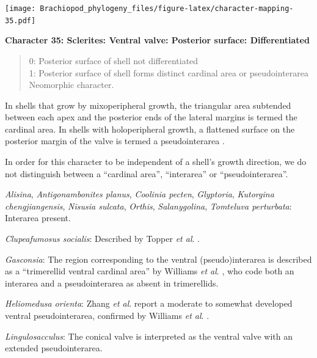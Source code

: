 \documentclass[openany]{book}
\theoremstyle{definition}
\theoremstyle{definition}
\theoremstyle{definition}
\theoremstyle{remark}
\begin{document}
\texttt{[image: Brachiopod\_phylogeny\_files/figure-latex/character-mapping-35.pdf]}

\textbf{Character 35: Sclerites: Ventral valve: Posterior surface:
Differentiated}

\begin{quote}
0: Posterior surface of shell not differentiated\\
1: Posterior surface of shell forms distinct cardinal area or
pseudointerarea\\
Neomorphic character.
\end{quote}

In shells that grow by mixoperipheral growth, the triangular area
subtended between each apex and the posterior ends of the lateral
margins is termed the cardinal area. In shells with holoperipheral
growth, a flattened surface on the posterior margin of the valve is
termed a pseudointerarea
\citep[paraphrasing][]{Williams1997Introduction}.

In order for this character to be independent of a shell's growth
direction, we do not distinguish between a ``cardinal area'',
``interarea'' or ``pseudointerarea''.

\hypertarget{Alisina-coding-35}{}
\emph{Alisina}, \emph{Antigonambonites planus}, \emph{Coolinia pecten},
\emph{Glyptoria}, \emph{Kutorgina chengjiangensis}, \emph{Nisusia
sulcata}, \emph{Orthis}, \emph{Salanygolina}, \emph{Tomteluva
perturbata}: Interarea present.

\hypertarget{Clupeafumosus_socialis-coding-35}{}
\emph{Clupeafumosus socialis}: Described by Topper \emph{et al}.
\citeyearpar{Topper2013Reappraisalof}.

\hypertarget{Gasconsia-coding-35}{}
\emph{Gasconsia}: The region corresponding to the ventral
(pseudo)interarea is described as a ``trimerellid ventral cardinal
area'' by Williams \emph{et al}.
\citeyearpar[p.162]{Williams2000LinguliformeaCraniiformea}, who code
both an interarea and a pseudointerarea as absent in trimerellids.

\hypertarget{Heliomedusa_orienta-coding-35}{}
\emph{Heliomedusa orienta}: Zhang \emph{et al}.
\citeyearpar{Zhang2009Architectureand} report a moderate to somewhat
developed ventral pseudointerarea, confirmed by Williams \emph{et al}.
\citeyearpar{Williams2007Supplement}.

\hypertarget{Lingulosacculus-coding-35}{}
\emph{Lingulosacculus}: The conical valve is interpreted as the ventral
valve with an extended pseudointerarea.
\end{document}
